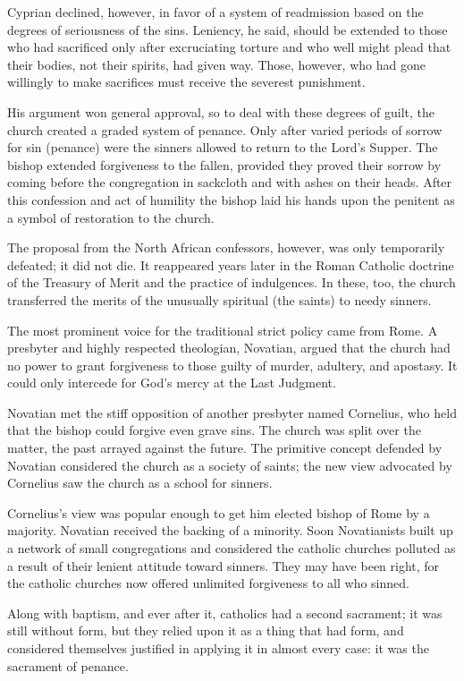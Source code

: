 Cyprian declined, however, in favor of a system of readmission based on the degrees of seriousness
of the sins. Leniency, he said, should be extended to those who had sacrificed only after
excruciating torture and who well might plead that their bodies, not their spirits, had given way.
Those, however, who had gone willingly to make sacrifices must receive the severest punishment.

His argument won general approval, so to deal with these degrees of guilt, the church created a
graded system of penance. Only after varied periods of sorrow for sin (penance) were the sinners
allowed to return to the Lord’s Supper. The bishop extended forgiveness to the fallen, provided they
proved their sorrow by coming before the congregation in sackcloth and with ashes on their heads.
After this confession and act of humility the bishop laid his hands upon the penitent as a symbol of
restoration to the church.

The proposal from the North African confessors, however, was only temporarily defeated; it did not
die. It reappeared years later in the Roman Catholic doctrine of the Treasury of Merit and the
practice of indulgences. In these, too, the church transferred the merits of the unusually spiritual
(the saints) to needy sinners.

The most prominent voice for the traditional strict policy came from Rome. A presbyter and highly
respected theologian, Novatian, argued that the church had no power to grant forgiveness to those
guilty of murder, adultery, and apostasy. It could only intercede for God’s mercy at the Last
Judgment.

Novatian met the stiff opposition of another presbyter named Cornelius, who held that the bishop
could forgive even grave sins. The church was split over the matter, the past arrayed against the
future. The primitive concept defended by Novatian considered the church as a society of saints; the
new view advocated by Cornelius saw the church as a school for sinners.

Cornelius’s view was popular enough to get him elected bishop of Rome by a majority. Novatian
received the backing of a minority. Soon Novatianists built up a network of small congregations and
considered the catholic churches polluted as a result of their lenient attitude toward sinners. They
may have been right, for the catholic churches now offered unlimited forgiveness to all who sinned.

Along with baptism, and ever after it, catholics had a second sacrament; it was still without form,
but they relied upon it as a thing that had form, and considered themselves justified in applying it
in almost every case: it was the sacrament of penance.

